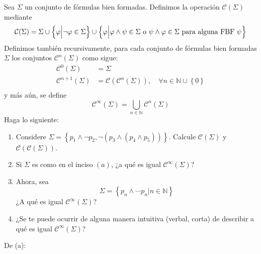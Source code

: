 \documentclass[12pt]{report}
\theoremstyle{largebreak}
\begin{document}
    \begin{excer}
        Sea $\Sigma$ un conjunto de fórmulas bien formadas. Definimos la operación $\mathcal{C}(\Sigma)$ mediante
        \begin{equation*}
            \mathcal{C}(\Sigma)=\Sigma\cup\left\{\varphi\Big|\neg\varphi\in\Sigma \right\}\cup\left\{\varphi\Big|\varphi\land\psi\in\Sigma\textup{ o }\psi\land\varphi\in\Sigma\textup{ para alguna FBF }\psi \right\}
        \end{equation*}
        Definimos también recursivamente, para cada conjunto de fórmulas bien formadas $\Sigma$ los conjuntos $\mathcal{C}^n(\Sigma)$ como sigue:
        \begin{equation*}
            \begin{split}
                \mathcal{C}^0(\Sigma)&=\Sigma\\
                \mathcal{C}^{n+1}(\Sigma)&=\mathcal{C}(\mathcal{C}^n(\Sigma)),\quad\forall n\in\mathbb{N}\cup\left\{0\right\}\\
            \end{split}
        \end{equation*}
        y más aún, se define
        \begin{equation*}
            \mathcal{C}^\infty(\Sigma)=\bigcup_{ n\in\mathbb{N}}\mathcal{C}^n(\Sigma)
        \end{equation*}
        Haga lo siguiente:
        \begin{enumerate}
            \item Considere $\Sigma=\left\{p_1\land\neg p_2,\neg(p_3\land(p_4\land p_5)) \right\}$. Calcule $\mathcal{C}(\Sigma)$ y $\mathcal{C}(\mathcal{C}(\Sigma))$.
            \item Si $\Sigma$ es como en el inciso $(a)$, ¿a qué es igual $\mathcal{C}^\infty(\Sigma)$?
            \item Ahora, sea
            \begin{equation*}
                \Sigma=\left\{p_n\land\cdots p_n\Big|n\in\mathbb{N} \right\}
            \end{equation*}
            ¿A qué es igual $\mathcal{C}^\infty(\Sigma)$?
            \item ¿Se te puede ocurrir de alguna manera intuitiva (verbal, corta) de describir a qué es igual $\mathcal{C}^\infty(\Sigma)$?
        \end{enumerate}
    \end{excer}
    
    \begin{sol}
        De (a): %
    \end{sol}
\end{document}
